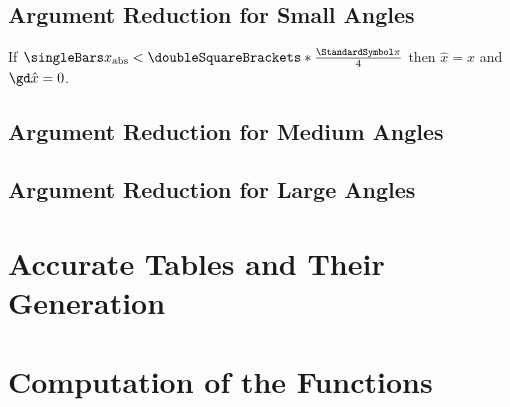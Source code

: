 \documentclass[10pt, a4paper, twoside]{basestyle}
\newcommand{\round}[1]{\doubleSquareBrackets*{#1}}
\begin{document}
\subsection*{Argument Reduction for Small Angles}
If $\abs x < \round{\frac{\Pi}{4}}$ then $\hat x = x$ and $\gd \hat x = 0$.
\subsection*{Argument Reduction for Medium Angles}
\subsection*{Argument Reduction for Large Angles}
\section*{Accurate Tables and Their Generation}
\section*{Computation of the Functions}
\end{document}
